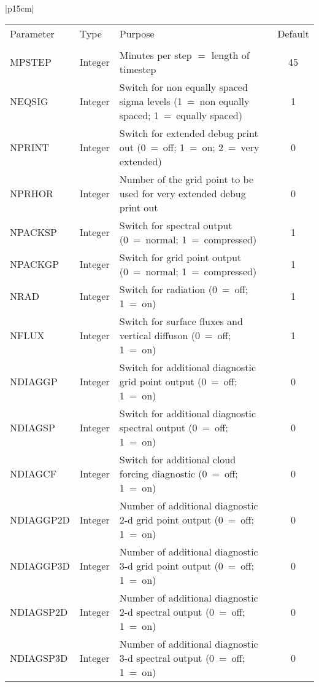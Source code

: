 \begin{center}
\begin{tabular}{|p{15cm}|}
\hline
\begin{center}
\begin{tabular}{l l p{5cm} c} %
Parameter & Type & Purpose & Default \\
&&&\\
MPSTEP & Integer & Minutes per step $=$ length of timestep & 45 \\
NEQSIG & Integer & Switch for non equally spaced sigma levels (1~=~non equally spaced;
1~=~equally spaced) & 1 \\
NPRINT & Integer & Switch for extended debug print out (0~=~off; 1~=~on; 2~=~very
extended) & 0\\
NPRHOR & Integer & Number of the grid point to be used for very extended debug print out
&
0 \\
NPACKSP & Integer & Switch for spectral output (0~=~normal; 1~=~compressed) & 1 \\
NPACKGP & Integer & Switch for grid point output (0~=~normal; 1~=~compressed) & 1 \\
NRAD & Integer & Switch for radiation (0~=~off; 1~=~on) & 1 \\
NFLUX & Integer & Switch for surface fluxes and vertical diffuson (0~=~off; 1~=~on) & 1
\\
NDIAGGP & Integer & Switch for additional diagnostic grid point output (0~=~off; 1~=~on)
& 0\\
NDIAGSP & Integer & Switch for additional diagnostic spectral output (0~=~off; 1~=~on) &
0 \\
NDIAGCF & Integer & Switch for additional cloud forcing diagnostic (0~=~off; 1~=~on) &
0
\\
NDIAGGP2D & Integer & Number of  additional diagnostic 2-d grid point output (0~=~off;
1~=~on) & 0 \\
NDIAGGP3D & Integer & Number of  additional diagnostic 3-d grid point output (0~=~off;
1~=~on) & 0 \\
NDIAGSP2D & Integer & Number of  additional diagnostic 2-d spectral output (0~=~off;
1~=~on) & 0 \\
NDIAGSP3D & Integer & Number of  additional diagnostic 3-d spectral output (0~=~off;
1~=~on) & 0 \\
\end{tabular}
\end{center}
\vspace{3mm} \\
\hline
\end{tabular}
\end{center}

